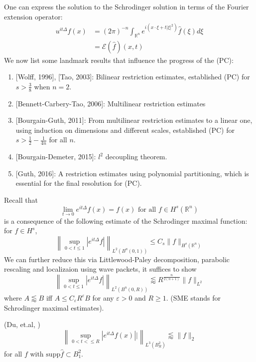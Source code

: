 \documentclass[openany]{book}
\newcommand{\R}{\mathbb{R}}
\begin{document}
One can express the solution to the Schrodinger solution in terms of the Fourier extension operator:
\begin{align*}
    u^{it\Delta}f(x)&=(2\pi)^{-n}\int_{\R^n}e^{i(x\cdot\xi+t|\xi|^2)}\hat{f}(\xi)d\xi\\
    &=\mathcal{E}(\hat{f})(x,t)
\end{align*}
We now list some landmark results that influence the progress of the (PC):
\begin{enumerate}
    \item{} [Wolff, 1996], [Tao, 2003]: Bilinear restriction estimates, established (PC) for $s>\frac{3}{8}$ when $n=2$.
    \item{} [Bennett-Carbery-Tao, 2006]:  Multilinear restriction estimates 
    \item{} [Bourgain-Guth, 2011]: From multilinear restriction estimates to a linear one, using induction on dimensions and different scales, established (PC) for $s>\frac{1}{2}-\frac{1}{4n}$ for all $n$. 
    \item{} [Bourgain-Demeter, 2015]: $l^2$ decoupling theorem.
    \item{} [Guth, 2016]: A restriction estimates using polynomial partitioning, which is essential for the final resolution for (PC).
\end{enumerate}
Recall that 
\begin{equation*}
    \lim_{t\to 0}e^{it\Delta}f(x)=f(x) \text{ for all  }f\in H^s(\R^n)
\end{equation*}
is a consequence of the following estimate of the Schrodinger maximal function: for $f\in H^s$, 
\begin{equation*}
    \left\|\sup_{0<t\leq 1}|e^{it\Delta}f|\right\|_{L^2(B^n(0,1))}\leq C_s\|f\|_{H^s(\R^n)}
\end{equation*}
We can further reduce this via Littlewood-Paley decomposition, parabolic rescaling and localizaion using wave packets, it suffices to show 
\begin{equation*}
    \left\|\sup_{0<t\leq 1}|e^{it\Delta}f|\right\|_{L^2(B^n(0,R))}\lessapprox R^\frac{n}{2(n+1)}\|f\|_{L^2}\tag{SME}
\end{equation*}
where $A\lessapprox B$ iff $A\leq C_\varepsilon R^\varepsilon B$ for any $\varepsilon>0$ and $R\geq 1$. (SME stands for Schrodinger maximal estimates).

\begin{thm}(Du, et.al, )
    \begin{equation*}
        \left\|\sup_{0<t<\leq R}|e^{it\Delta}f(x)||\right\|_{L^3(B_R^2)}\lessapprox \|f\|_2
    \end{equation*}
    for all $f$ with $\text{supp}\hat{f}\subset B_1^2$. 
\end{thm}
\end{document}

